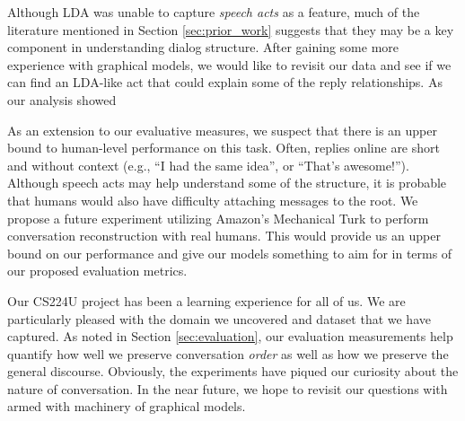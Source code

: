 \documentclass{article}
\begin{document}
Although LDA was unable to capture \textit{speech acts} as a feature, much of
the literature mentioned in Section \ref{sec:prior_work} suggests that they
may be a key component in understanding dialog structure. After gaining some
more experience with graphical models, we would like to revisit our data and
see if we can find an LDA-like act that could explain some of the reply
relationships. As our analysis showed

As an extension to our evaluative measures, we suspect that there is an upper
bound to human-level performance on this task. Often, replies online are short
and without context (e.g., ``I had the same idea'', or ``That's awesome!'').
Although speech acts may help understand some of the structure, it is probable
that humans would also have difficulty attaching messages to the root. We
propose a future experiment utilizing Amazon's Mechanical Turk to perform
conversation reconstruction with real humans. This would provide us an upper
bound on our performance and give our models something to aim for in terms of
our proposed evaluation metrics.

Our CS224U project has been a learning experience for all of us. We are
particularly pleased with the domain we uncovered and dataset that we have
captured. As noted in Section \ref{sec:evaluation}, our evaluation
measurements help quantify how well we preserve conversation \textit{order} as
well as how we preserve the general discourse. Obviously, the experiments have
piqued our curiosity about the nature of conversation. In the near future, we
hope to revisit our questions with armed with machinery of graphical models.

{} 

\end{document}
